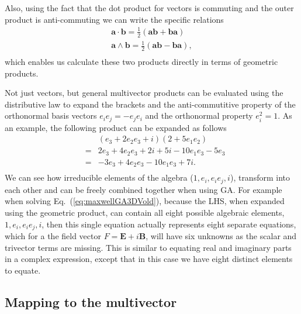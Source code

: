 \documentclass[12pt,aps,prb,preprint]{revtex4}   %
\newcommand{\bea}{\begin{eqnarray}}
\newcommand{\eea}{\end{eqnarray}}
\newcommand{\iGA}{{i}}
\begin{document}
Also, using the fact that the dot product for vectors is commuting and the outer product is anti-commuting we can write the specific relations
\bea
\textbf{a} \cdot \textbf{b} = \frac{1}{2} ( \textbf{a} \textbf{b} + \textbf{b} \textbf{a} ) \\ \nonumber
\textbf{a} \wedge \textbf{b} = \frac{1}{2} ( \textbf{a} \textbf{b} - \textbf{b} \textbf{a} ), \\ \nonumber
\eea
which enables us calculate these two products directly in terms of geometric products.


Not just vectors, but general multivector products can be evaluated using the distributive law to expand the brackets and the anti-commutitive property of the orthonormal basis vectors $ e_i e_j = - e_j e_i $ and the orthonormal property $ e_i^2 = 1 $.  As an example, the following product can be expanded as follows
\bea
& & ( e_3 + 2 e_2 e_3 + i)(2 + 5 e_1 e_2) \\ \nonumber
& = &  2 e_3 + 4 e_2 e_3 + 2 i + 5 i - 10 e_1 e_3 - 5 e_3 \\ \nonumber
& = & -3 e_3 + 4 e_2 e_3  - 10 e_1 e_3  + 7 i .\\ \nonumber
\eea
We can see how irreducible elements of the algebra ($1,e_i, e_i e_j, \iGA $), transform into each other and can be freely combined together when using GA.
For example when solving Eq.~(\ref{eq:maxwellGA3DVold}), because the LHS, when expanded using the geometric product, can contain all eight possible algebraic elements, $1,e_i, e_i e_j, \iGA $, then this single equation actually represents eight separate equations, which for a the field vector $ F = \textbf{E} + \iGA \textbf{B} $, will have six unknowns as the scalar and trivector terms are missing.  This is similar to equating real and imaginary parts in a complex expression, except that in this case we have eight distinct elements to equate.

\subsection{Mapping to the multivector}
\end{document}
